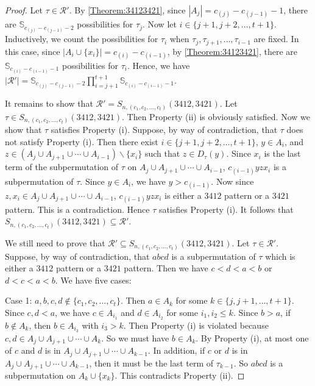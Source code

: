 \documentclass[10pt,a4paper]{amsart}
\begin{document}
\begin{proof}
    Let $\tau\in\mathcal{R}'$. By \cref{Theorem:34123421}, since $|A_j|=c_{(j)}-c_{(j-1)}-1$, there are $\mathbb{S}_{c_{(j)}-c_{(j-1)}-2}$ possibilities for $\tau_j$. Now let $i\in\{j+1,j+2,\ldots,t+1\}$. Inductively, we count the possibilities for $\tau_i$ when $\tau_j,\tau_{j+1},\ldots,\tau_{i-1}$ are fixed. In this case, since $|A_i\cup\{x_i\}|=c_{(i)}-c_{(i-1)}$, by \cref{Theorem:34123421}, there are $\mathbb{S}_{c_{(i)}-c_{(i-1)}-1}$ possibilities for $\tau_i$. Hence, we have $|\mathcal{R}'|=\mathbb{S}_{c_{(j)}-c_{(j-1)}-2}\prod_{i=j+1}^{t+1}\mathbb{S}_{c_{(i)}-c_{(i-1)}-1}$.

    It remains to show that $\mathcal{R}'=S_{n,(c_1,c_2,\ldots,c_t)}(3412,3421)$. Let $\tau\in S_{n,(c_1,c_2,\ldots,c_t)}(3412,3421)$. Then Property (ii) is obviously satisfied. Now we show that $\tau$ satisfies Property (i). Suppose, by way of contradiction, that $\tau$ does not satisfy Property (i). Then there exist $i\in\{j+1,j+2,\ldots,t+1\}$, $y\in A_i$, and $z\in (A_j\cup A_{j+1}\cup\cdots \cup A_{i-1})\backslash\{x_i\}$ such that $z\in D_\tau(y)$. Since $x_i$ is the last term of the subpermutation of $\tau$ on $A_j\cup A_{j+1}\cup\cdots\cup A_{i-1}$, $c_{(i-1)}yzx_i$ is a subpermutation of $\tau$. Since $y\in A_i$, we have $y>c_{(i-1)}$. Now since $z,x_i\in A_j\cup A_{j+1}\cup\cdots \cup A_{i-1}$, $c_{(i-1)}yzx_i$ is either a $3412$ pattern or a $3421$ pattern. This is a contradiction. Hence $\tau$ satisfies Property (i). It follows that $S_{n,(c_1,c_2,\ldots,c_t)}(3412,3421)\subseteq\mathcal{R}'$. 

    We still need to prove that $\mathcal{R}'\subseteq S_{n,(c_1,c_2,\ldots,c_t)}(3412,3421)$. Let $\tau\in \mathcal{R}'$. Suppose, by way of contradiction, that $abcd$ is a subpermutation of $\tau$ which is either a $3412$ pattern or a $3421$ pattern. Then we have $c<d<a<b$ or $d<c<a<b$. We have five cases:

    Case 1: $a,b,c,d\notin\{c_1,c_2,\ldots,c_t\}$. Then $a\in A_k$ for some $k\in\{j,j+1,\ldots,t+1\}$. Since $c,d<a$, we have $c\in A_{i_1}$ and $d\in A_{i_2}$ for some $i_1,i_2\leq k$. Since $b>a$, if $b\notin A_k$, then $b\in A_{i_3}$ with $i_3>k$. Then Property (i) is violated because $c,d\in A_j\cup A_{j+1}\cup\cdots\cup A_{k}$. So we must have $b\in A_k$. By Property (i), at most one of $c$ and $d$ is in $A_j\cup A_{j+1}\cup\cdots\cup A_{k-1}$. In addition, if $c$ or $d$ is in $A_j\cup A_{j+1}\cup\cdots\cup A_{k-1}$, then it must be the last term of $\tau_{k-1}$. So $abcd$ is a subpermutation on $A_k\cup\{x_k\}$. This contradicts Property (ii).
    

\end{proof}
\end{document}
